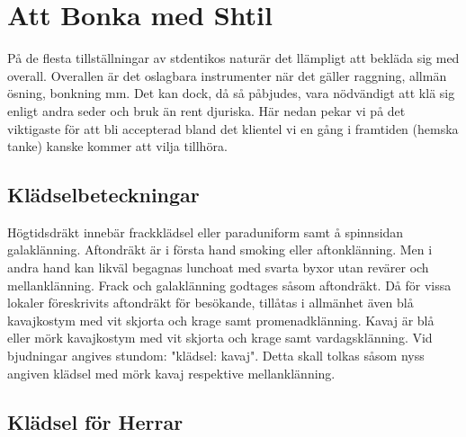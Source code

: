 
\pagestyle{Att Bonka med Shtil}

\section{\textbf{Att Bonka med Shtil}}

    På de flesta tillställningar av stdentikos naturär det llämpligt att bekläda sig med overall. Overallen är det oslagbara instrumenter när det gäller raggning, allmän ösning, bonkning  mm. Det kan dock, då så påbjudes, vara nödvändigt att klä sig enligt andra seder och bruk än rent djuriska. Här nedan pekar vi på det viktigaste för att bli accepterad bland det klientel vi en gång i framtiden (hemska tanke) kanske kommer att vilja tillhöra.

    \subsection{\textbf{Klädselbeteckningar}}
    Högtidsdräkt innebär frackklädsel eller paraduniform samt å spinnsidan galaklänning. Aftondräkt är i första hand smoking eller aftonklänning. Men i andra hand kan likväl begagnas lunchoat med svarta byxor utan revärer och mellanklänning. Frack och galaklänning godtages såsom aftondräkt. Då för vissa lokaler föreskrivits aftondräkt för besökande, tillåtas i allmänhet även blå kavajkostym med vit skjorta och krage samt promenadklänning. Kavaj är blå eller mörk kavajkostym med vit skjorta och krage samt vardagsklänning. Vid bjudningar angives stundom: "klädsel: kavaj". Detta skall tolkas såsom nyss angiven klädsel med mörk kavaj respektive mellanklänning.

    \subsection{\textbf{Klädsel för Herrar}}
